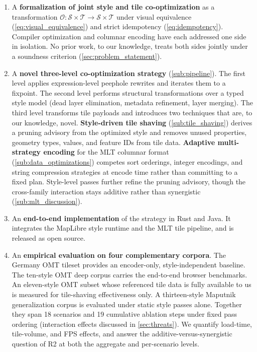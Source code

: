 \begin{enumerate}[label=\textbf{C\arabic*}]
    \item A \textbf{formalization of joint style and tile co-optimization} as a transformation $\mathcal{O}: \mathcal{S} \times \mathcal{T} \to \mathcal{S} \times \mathcal{T}$ under visual equivalence (\cref{eq:visual_equivalence}) and strict idempotency (\cref{eq:idempotency}).
    Compiler optimization and columnar encoding have each addressed one side in isolation.
    No prior work, to our knowledge, treats both sides jointly under a soundness criterion (\cref{sec:problem_statement}).

    \item A \textbf{novel three-level co-optimization strategy} (\cref{sub:pipeline}).
    The first level applies expression-level peephole rewrites and iterates them to a fixpoint.
    The second level performs structural transformations over a typed style model (dead layer elimination, metadata refinement, layer merging).
    The third level transforms tile payloads and introduces two techniques that are, to our knowledge, novel.
    \textbf{Style-driven tile shaving} (\cref{sub:tile_shaving}) derives a pruning advisory from the optimized style and removes unused properties, geometry types, values, and feature IDs from tile data.
    \textbf{Adaptive multi-strategy encoding} for the \ac{MLT} columnar format (\cref{sub:data_optimizations}) competes sort orderings, integer encodings, and string compression strategies at encode time rather than committing to a fixed plan.
    Style-level passes further refine the pruning advisory, though the cross-family interaction stays additive rather than synergistic (\cref{sub:mlt_discussion}).

    \item An \textbf{end-to-end implementation} of the strategy in Rust and Java.
    It integrates the MapLibre style runtime and the \ac{MLT} tile pipeline, and is released as open source.

    \item An \textbf{empirical evaluation on four complementary corpora}.
    The Germany \ac{OMT} tileset provides an encoder-only, style-independent baseline.
    The ten-style \ac{OMT} deep corpus carries the end-to-end browser benchmarks.
    An eleven-style \ac{OMT} subset whose referenced tile data is fully available to us is measured for tile-shaving effectiveness only.
    A thirteen-style Maputnik generalization corpus is evaluated under static style passes alone.
    Together they span 18 scenarios and 19 cumulative ablation steps under fixed pass ordering (interaction effects discussed in \cref{sec:threats}).
    We quantify load-time, tile-volume, and \ac{FPS} effects, and answer the additive-versus-synergistic question of R2 at both the aggregate and per-scenario levels.
\end{enumerate}

